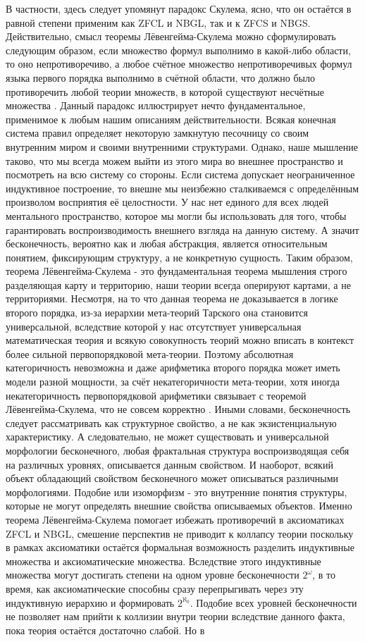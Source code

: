 \documentclass[12pt]{article}
\begin{document}
В частности, здесь следует упомянут парадокс Скулема, ясно, что он остаётся в равной степени применим как ZFCL и NBGL, так и к ZFCS и NBGS. Действительно, смысл теоремы Лёвенгейма-Скулема можно сформулировать следующим образом, если множество формул выполнимо в какой-либо области, то оно непротиворечиво, а любое счётное множество непротиворечивых формул языка первого порядка выполнимо в счётной области, что должно было противоречить любой теории множеств, в которой существуют несчётные множества \cite{fraenkel-skolem}. Данный парадокс иллюстрирует нечто фундаментальное, применимое к любым нашим описаниям действительности. Всякая конечная система правил определяет некоторую замкнутую песочницу со своим внутренним миром и своими внутренними структурами. Однако, наше мышление таково, что мы всегда можем выйти из этого мира во внешнее пространство и посмотреть на всю систему со стороны. Если система допускает неограниченное индуктивное построение, то внешне мы неизбежно сталкиваемся с определённым произволом восприятия её целостности. У нас нет единого для всех людей ментального пространство, которое мы могли бы использовать для того, чтобы гарантировать воспроизводимость внешнего взгляда на данную систему. А значит бесконечность, вероятно как и любая абстракция, является относительным понятием, фиксирующим структуру, а не конкретную сущность. Таким образом, теорема Лёвенгейма-Скулема - это фундаментальная теорема мышления строго разделяющая карту и территорию, наши теории всегда оперируют картами, а не территориями. Несмотря, на то что данная теорема не доказывается в логике второго порядка, из-за иерархии мета-теорий Тарского она становится универсальной, вследствие которой у нас отсутствует универсальная математическая теория и всякую совокупность теорий можно вписать в контекст более сильной первопорядковой мета-теории. Поэтому абсолютная категоричность невозможна и даже арифметика второго порядка может иметь модели разной мощности, за счёт некатегоричности мета-теории, хотя иногда некатегоричность первопорядковой арифметики связывает с теоремой Лёвенгейма-Скулема, что не совсем корректно \cite{fraenkel-categoricity}. Иными словами, бесконечность следует рассматривать как структурное свойство, а не как экзистенциальную характеристику. А следовательно, не может существовать и универсальной морфологии бесконечного, любая фрактальная структура воспроизводящая себя на различных уровнях, описывается данным свойством. И наоборот, всякий объект обладающий свойством бесконечного может описываться различными морфологиями. Подобие или изоморфизм - это внутренние понятия структуры, которые не могут определять внешние свойства описываемых объектов. Именно теорема Лёвенгейма-Скулема помогает избежать противоречий в аксиоматиках ZFCL и NBGL, смешение перспектив не приводит к коллапсу теории поскольку в рамках аксиоматики остаётся формальная возможность разделить индуктивные множества и аксиоматические множества. Вследствие этого индуктивные множества могут достигать степени на одном уровне бесконечности $2^{\omega}$, в то время, как аксиоматические способны сразу перепрыгивать через эту индуктивную иерархию и формировать $2^{\aleph_0}$. Подобие всех уровней бесконечности не позволяет нам прийти к коллизии внутри теории вследствие данного факта, пока теория остаётся достаточно слабой. Но в 
\end{document}
